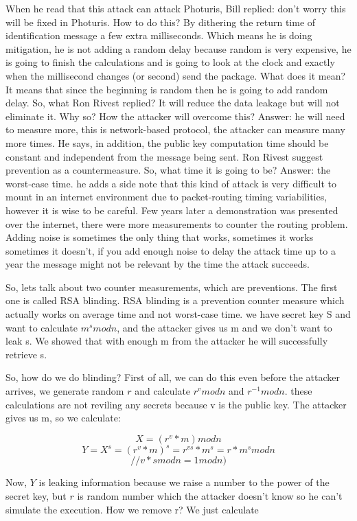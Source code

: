 When he read that this attack can attack Photuris, Bill replied: don't worry
this will be fixed in Photuris. How to do this? By dithering the return time of
identification message a few extra milliseconds. Which means he is doing
mitigation, he is not adding a random delay because random is very expensive, he
is going to finish the calculations and is going to look at the clock and
exactly when the millisecond changes (or second) send the package. What does it
mean? It means that since the beginning is random then he is going to add random
delay. So, what Ron Rivest replied? It will reduce the data leakage but will not
eliminate it. Why so? How the attacker will overcome this? Answer: he will need
to measure more, this is network-based protocol, the attacker can measure many
more times. He says, in addition, the public key computation time should be
constant and independent from the message being sent. Ron Rivest suggest
prevention as a countermeasure. So, what time it is going to be? Answer: the
worst-case time. he adds a side note that this kind of attack is very difficult
to mount in an internet environment due to packet-routing timing variabilities,
however it is wise to be careful. Few years later a demonstration was presented
over the internet, there were more measurements to counter the routing problem.
Adding noise is sometimes the only thing that works, sometimes it works
sometimes it doesn't, if you add enough noise to delay the attack time up to a
year the message might not be relevant by the time the attack succeeds.

So, lets talk about two counter measurements, which are preventions. The first
one is called RSA blinding. RSA blinding is a prevention counter measure which
actually works on average time and not worst-case time. we have secret key S and
want to calculate \(m^s mod n\), and the attacker gives us m and we don't want
to leak s. We showed that with enough m from the attacker he will successfully
retrieve s. 

So, how do we do blinding? First of all, we can do this even before the attacker
arrives, we generate random $r$ and calculate \(r^v mod n\) and \(r^{-1} mod
n\). these calculations are not reviling any secrets because v is the public
key. The attacker gives us m, so we calculate: 

\[X = (r^v * m) mod n\]
\[Y = X^s = (r^v*m)^s = r^{vs}*m^s = r*m^s mod n \] 
\[ // v*s mod n = 1 mod n)\]

Now, $Y$ is leaking information because we raise a number to the power of the
secret key, but $r$ is random number which the attacker doesn't know so he can't
simulate the execution. How we remove r? We just calculate 

